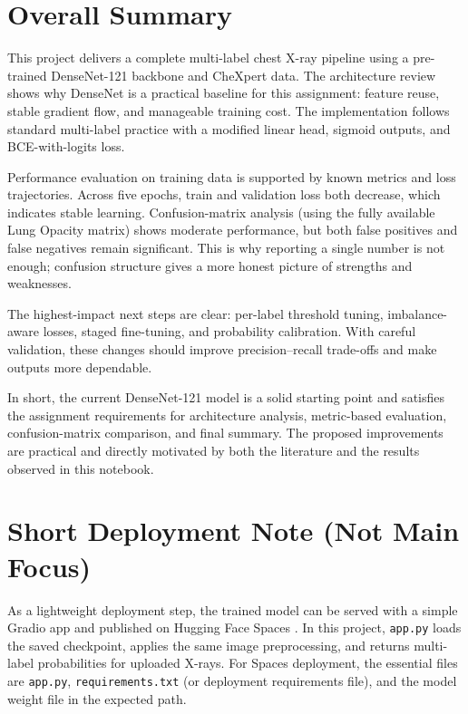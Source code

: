 \documentclass[12pt]{article}
\begin{document}
\section{Overall Summary}
This project delivers a complete multi-label chest X-ray pipeline using a pre-trained DenseNet-121 backbone and CheXpert data. The architecture review shows why DenseNet is a practical baseline for this assignment: feature reuse, stable gradient flow, and manageable training cost. The implementation follows standard multi-label practice with a modified linear head, sigmoid outputs, and BCE-with-logits loss.

Performance evaluation on training data is supported by known metrics and loss trajectories. Across five epochs, train and validation loss both decrease, which indicates stable learning. Confusion-matrix analysis (using the fully available Lung Opacity matrix) shows moderate performance, but both false positives and false negatives remain significant. This is why reporting a single number is not enough; confusion structure gives a more honest picture of strengths and weaknesses.

The highest-impact next steps are clear: per-label threshold tuning, imbalance-aware losses, staged fine-tuning, and probability calibration. With careful validation, these changes should improve precision--recall trade-offs and make outputs more dependable.

In short, the current DenseNet-121 model is a solid starting point and satisfies the assignment requirements for architecture analysis, metric-based evaluation, confusion-matrix comparison, and final summary. The proposed improvements are practical and directly motivated by both the literature and the results observed in this notebook.

\section*{Short Deployment Note (Not Main Focus)}
As a lightweight deployment step, the trained model can be served with a simple Gradio app and published on Hugging Face Spaces \citep{gradio_docs,hf_spaces_docs}. In this project, \texttt{app.py} loads the saved checkpoint, applies the same image preprocessing, and returns multi-label probabilities for uploaded X-rays. For Spaces deployment, the essential files are \texttt{app.py}, \texttt{requirements.txt} (or deployment requirements file), and the model weight file in the expected path.
\end{document}
